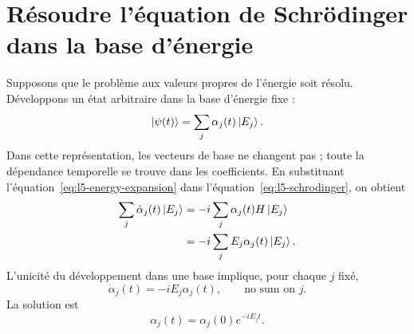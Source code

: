 \begin{classroomqa}\end{classroomqa}

\begin{classroomqa}\end{classroomqa}

\section{Résoudre l’équation de Schr\"odinger dans la base d’énergie}

Supposons que le problème aux valeurs propres de l’énergie soit résolu. Développons un état arbitraire dans la base d’énergie fixe :
\begin{equation}
\left\lvert\psi(t)\right\rangle=\sum_j\alpha_j(t)\left\lvert E_j\right\rangle.
\label{eq:l5-energy-expansion}
\end{equation}
Dans cette représentation, les vecteurs de base ne changent pas ; toute la dépendance temporelle se trouve dans les coefficients. En substituant l’équation~\eqref{eq:l5-energy-expansion} dans l’équation~\eqref{eq:l5-schrodinger}, on obtient
\begin{align}
\sum_j\dot\alpha_j(t)\left\lvert E_j\right\rangle
&=-i\sum_j\alpha_j(t)H\left\lvert E_j\right\rangle\\
&=-i\sum_j E_j\alpha_j(t)\left\lvert E_j\right\rangle.
\end{align}
L’unicité du développement dans une base implique, pour chaque \(j\) fixé,
\begin{equation}
\dot\alpha_j(t)=-iE_j\alpha_j(t),
\qquad\text{no sum on \(j\)}.
\end{equation}
La solution est
\begin{equation}
\alpha_j(t)=\alpha_j(0)e^{-iE_jt}.
\label{eq:l5-energy-phase}
\end{equation}

